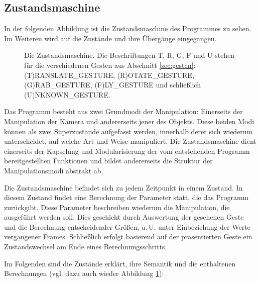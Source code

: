 \subsection{Zustandsmaschine}\label{sec:statemachine}
In der folgenden Abbildung ist die Zustandsmaschine des Programmes zu sehen. Im Weiteren wird auf die Zustände und ihre Übergänge eingegangen.
\begin{figure}[H]
	\centering
	
	\caption{Die Zustandsmaschine. Die Beschriftungen T, R, G, F und U stehen für die verschiedenen Gesten aus Abschnitt \ref{sec:gesten}: (T)RANSLATE\_GESTURE, (R)OTATE\_GESTURE, (G)RAB\_GESTURE, (F)LY\_GESTURE und schließlich (U)NKNOWN\_GESTURE.}\label{fig:sm}
	\end{figure}	
	Das Programm besteht aus zwei Grundmodi der Manipulation: Einerseits der Manipulation der Kamera und andererseits jener des Objekts. Diese beiden Modi können als zwei Superzustände aufgefasst werden, innerhalb derer sich wiederum unterscheidet, auf welche Art und Weise manipuliert. Die Zustandsmaschine dient einerseits der Kapselung und Modularisierung der vom entstehenden Programm bereitgestellten Funktionen und bildet andererseits die Struktur der Manipulationsmodi abstrakt ab.\par 
	Die Zustandsmaschine befindet sich zu jedem Zeitpunkt in einem Zustand. In diesem Zustand findet eine Berechnung der Parameter statt, die das Programm zurückgibt. Diese Parameter beschreiben wiederum die Manipulation, die ausgeführt werden soll. Dies geschieht durch Auswertung der gesehenen Geste und die Berechnung entscheidender Größen, u.\,U. unter Einbeziehung der Werte vergangener Frames. Schließlich erfolgt basierend auf der präsentierten Geste ein Zustandswechsel am Ende eines Berechnungsschritts.\par 
	Im Folgenden sind die Zustände erklärt, ihre Semantik und die enthaltenen Berechnungen (vgl. dazu auch wieder Abbildung \ref{fig:sm}):
